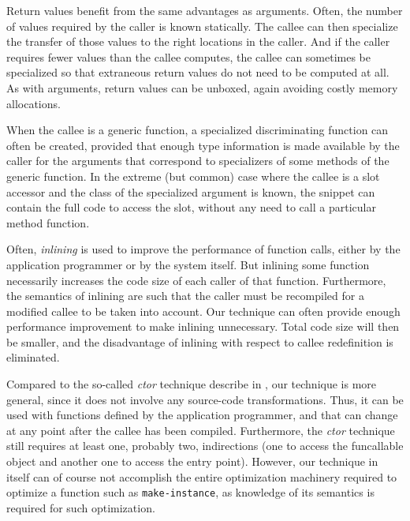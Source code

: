 Return values benefit from the same advantages as arguments.  Often,
the number of values required by the caller is known statically.  The
callee can then specialize the transfer of those values to the right
locations in the caller.  And if the caller requires fewer values than
the callee computes, the callee can sometimes be specialized so that
extraneous return values do not need to be computed at all.  As with
arguments, return values can be unboxed, again avoiding costly memory
allocations.

When the callee is a generic function, a specialized discriminating
function can often be created, provided that enough type information
is made available by the caller for the arguments that correspond to
specializers of some methods of the generic function.  In the extreme
(but common) case where the callee is a slot accessor and the class of
the specialized argument is known, the snippet can contain the full
code to access the slot, without any need to call a particular method
function.

Often, \emph{inlining} is used to improve the performance of function
calls, either by the application programmer or by the system itself.
But inlining some function necessarily increases the code size of each
caller of that function.  Furthermore, the semantics of inlining are
such that the caller must be recompiled for a modified callee to be
taken into account.  Our technique can often provide enough
performance improvement to make inlining unnecessary.  Total code size
will then be smaller, and the disadvantage of inlining with respect to
callee redefinition is eliminated.

Compared to the so-called \emph{ctor} technique describe in
, our technique is more general, since it
does not involve any source-code transformations.  Thus, it can be
used with functions defined by the application programmer, and that
can change at any point after the callee has been compiled.
Furthermore, the \emph{ctor} technique still requires at least one,
probably two, indirections (one to access the funcallable object and
another one to access the entry point).  However, our technique in
itself can of course not accomplish the entire optimization machinery
required to optimize a function such as \texttt{make-instance}, as
knowledge of its semantics is required for such optimization.

